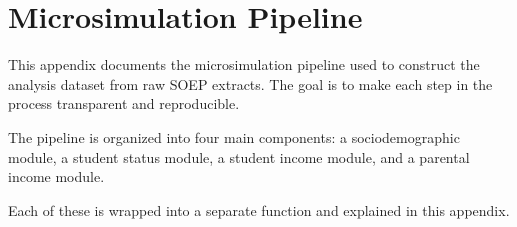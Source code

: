 
%


\newpage
\section{Microsimulation Pipeline}
\label{appendix:microsimulation-pipeline}

This appendix documents the microsimulation pipeline used to construct the analysis dataset from raw SOEP extracts. 
The goal is to make each step in the process transparent and reproducible. 

The pipeline is organized into four main components: a sociodemographic module, a student status module, a student income module, and a parental income module. 

Each of these is wrapped into a separate function and explained in this appendix.

